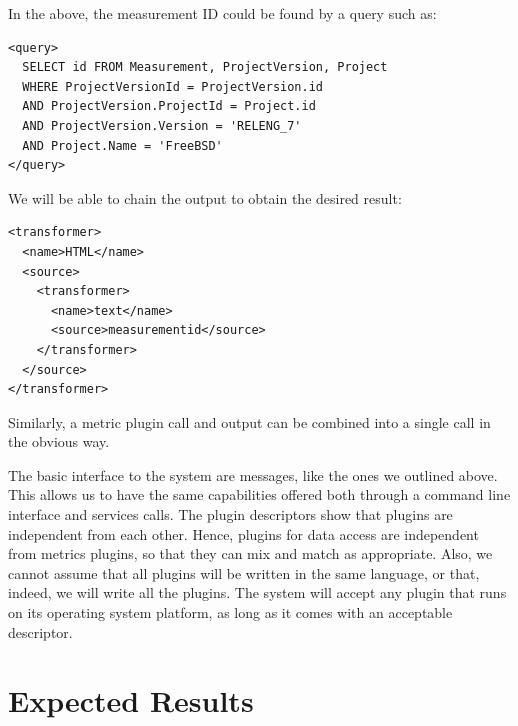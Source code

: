 \documentclass{llncs}
\begin{document}
In the above, the measurement ID could be found by a query such as:

\begin{verbatim}
<query>
  SELECT id FROM Measurement, ProjectVersion, Project
  WHERE ProjectVersionId = ProjectVersion.id
  AND ProjectVersion.ProjectId = Project.id
  AND ProjectVersion.Version = 'RELENG_7'
  AND Project.Name = 'FreeBSD'
</query>
\end{verbatim}

We will be able to chain the output to obtain the desired result:

\begin{verbatim}
<transformer>
  <name>HTML</name>
  <source>
    <transformer>
      <name>text</name>
      <source>measurementid</source>
    </transformer>
  </source>
</transformer>
\end{verbatim}

Similarly, a metric plugin call and output can be combined into a single
call in the obvious way.

The basic interface to the system are messages, like the ones we outlined
above. This allows us to have the same capabilities offered both through a
command line interface and services calls. The plugin descriptors show that
plugins are independent from each other. Hence, plugins for data access are
independent from metrics plugins, so that they can mix and match as
appropriate. Also, we cannot assume that all plugins will be written in the
same language, or that, indeed, we will write all the plugins. The system will
accept any plugin that runs on its operating system platform, as long as it
comes with an acceptable descriptor.

\section{Expected Results} %
\label{sec:expected-results}
\end{document}
